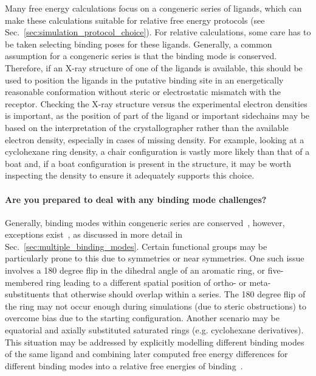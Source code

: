 \documentclass[9pt,bestpractices]{livecoms}
\begin{document}
Many free energy calculations focus on a congeneric series of ligands, which can make these calculations suitable for relative free energy protocols (see Sec.~\ref{sec:simulation_protocol_choice}). For relative calculations, some care has to be taken selecting binding poses for these ligands. Generally, a common assumption for a congeneric series is that the binding mode is conserved. Therefore, if an X-ray structure of one of the ligands is available, this should be used to position the ligands in the putative binding site in an energetically reasonable conformation without steric or electrostatic mismatch with the receptor. Checking the X-ray structure versus the experimental electron densities is important, as the position of part of the ligand or important sidechains may be based on the interpretation of the crystallographer rather than the available electron density, especially in cases of missing density. For example, looking at a cyclohexane ring density, a chair configuration is vastly more likely than that of a boat and, if a boat configuration is present in the structure, it may be worth inspecting the density to ensure it adequately supports this choice. 

\paragraph{Are you prepared to deal with any binding mode challenges?}
Generally, binding modes within congeneric series are conserved~\cite{wacker2010conserved}, however, exceptions exist~\cite{brandt2011congeneric,nazare2005probing}, as discussed in more detail in Sec.~\ref{sec:multiple_binding_modes}. Certain functional groups may be particularly prone to this due to symmetries or near symmetries. One such issue involves a 180 degree flip in the dihedral angle of an aromatic ring, or five-membered ring leading to a different spatial position of ortho- or meta- substituents that otherwise should overlap within a series. The 180 degree flip of the ring may not occur enough during simulations (due to steric obstructions) to overcome bias due to the starting configuration. Another scenario may be equatorial and axially substituted saturated rings (e.g. cyclohexane derivatives). This situation may be addressed by explicitly modelling different binding modes of the same ligand and combining later computed free energy differences for different binding modes into a relative free energies of binding~\cite{kaus2015how}.
\end{document}
